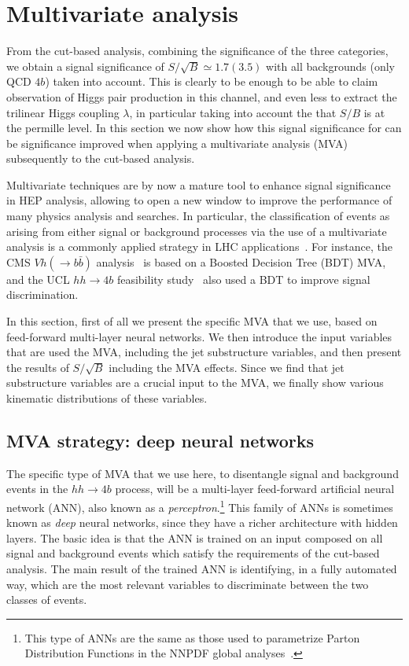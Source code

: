 
\section{Multivariate analysis}
\label{sec:mva}

From the cut-based analysis,
combining the significance of the three categories,
we obtain a signal significance of $S/\sqrt{B}\simeq 1.7 (3.5)$
with all backgrounds (only QCD $4b$) taken into account.
%
This is clearly
to be enough to be able to claim observation
of Higgs pair production
in this channel, and even less to extract the trilinear Higgs  coupling
$\lambda$, in particular
taking into account the that $S/B$ is at the permille level.
%
In this section we now show how this signal significance for
 can
be significance improved when
applying a multivariate analysis (MVA) subsequently
to the cut-based analysis.

 
%
Multivariate techniques are by now a mature tool to enhance signal
significance in HEP analysis, allowing
to open a new window to improve the performance
of many physics analysis and searches.
%
In particular, the classification of events as arising from either signal or
background processes via the use of a multivariate analysis is a
commonly applied strategy in LHC
applications~\cite{Baldi:2014pta,Aaltonen:2012qt,
  Wardrope:2014kya,Chatrchyan:2013zna,Dall'Osso:2015aia}.
%
For instance, the CMS $Vh(\to b\bar{b})$ analysis~\cite{Chatrchyan:2013zna}
is based on a Boosted Decision Tree (BDT) MVA, and the UCL $hh\to 4b$
feasibility study~\cite{Wardrope:2014kya}
also used  a BDT to improve signal discrimination.

In this section, first of all we present the specific MVA that we use,
based on feed-forward multi-layer neural networks.
%
We then introduce the input variables that are
used the MVA, including the jet substructure
variables, and then present the results of $S/\sqrt{B}$ including
the MVA effects.
%
Since we find that jet substructure variables are a crucial input
to the MVA, we finally show various kinematic distributions
of these variables.



\subsection{MVA strategy: deep neural networks}


%
The specific type of  MVA that we use here, to
disentangle signal and background events in the $hh\to 4b$ process, will be
a multi-layer feed-forward artificial neural network (ANN),
also known as a {\it perceptron}.\footnote{This type of ANNs are the same
  as those used to parametrize Parton Distribution Functions
in the NNPDF global analyses~\cite{DelDebbio:2004qj,Ball:2008by,Ball:2011mu,Ball:2010de}.}
%
This family of ANNs is sometimes known as {\it deep} neural networks, since they have
a richer architecture with hidden layers.
%
The basic idea is that the ANN is trained on an input composed on
all  signal and background
events which satisfy the requirements of the
cut-based analysis.
%
The main result of the trained ANN is identifying, in a fully automated way,
which are the most relevant variables to discriminate between the two classes
of events.

